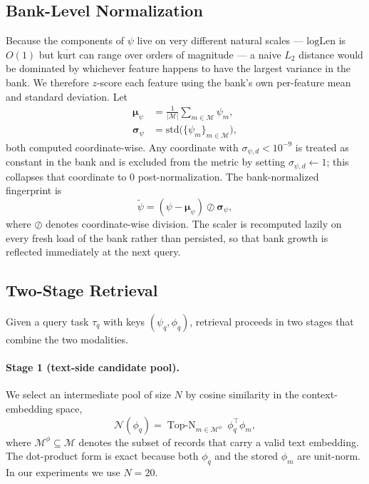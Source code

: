\subsection{Bank-Level Normalization}
\label{app:znorm}

Because the components of $\psi$ live on very different natural scales
--- $\mathrm{logLen}$ is $O(1)$ but $\overline{\mathrm{kurt}}$ can range
over orders of magnitude --- a naive $L_2$ distance would be dominated
by whichever feature happens to have the largest variance in the bank.
We therefore $z$-score each feature using the bank's own per-feature
mean and standard deviation. Let
\begin{align}
    \boldsymbol{\mu}_\psi &= \frac{1}{|\mathcal{M}|}
        \textstyle\sum_{m \in \mathcal{M}} \psi_m, \\
    \boldsymbol{\sigma}_\psi
        &= \mathrm{std}\big(\{\psi_m\}_{m \in \mathcal{M}}\big),
\end{align}
both computed coordinate-wise. Any coordinate with
$\sigma_{\psi, d} < 10^{-9}$ is treated as constant in the bank and is
excluded from the metric by setting $\sigma_{\psi, d} \gets 1$; this
collapses that coordinate to $0$ post-normalization. The
bank-normalized fingerprint is
\begin{equation}
    \tilde\psi = (\psi - \boldsymbol{\mu}_\psi) \oslash \boldsymbol{\sigma}_\psi,
\end{equation}
where $\oslash$ denotes coordinate-wise division. The scaler is
recomputed lazily on every fresh load of the bank rather than persisted,
so that bank growth is reflected immediately at the next query.

\subsection{Two-Stage Retrieval}
\label{app:retrieval}

Given a query task $\tau_q$ with keys $(\psi_q, \phi_q)$, retrieval
proceeds in two stages that combine the two modalities.

\paragraph{Stage 1 (text-side candidate pool).}
We select an intermediate pool of size $N$ by cosine similarity in the
context-embedding space,
\begin{equation}
    \mathcal{N}(\phi_q)
    = \!\!\mathop{\mathrm{Top\text{-}}N}_{m \in \mathcal{M}^\phi}\
    \phi_q^\top \phi_m,
\end{equation}
where $\mathcal{M}^\phi \subseteq \mathcal{M}$ denotes the subset of
records that carry a valid text embedding. The dot-product form is
exact because both $\phi_q$ and the stored $\phi_m$ are unit-norm. In
our experiments we use $N = 20$.

